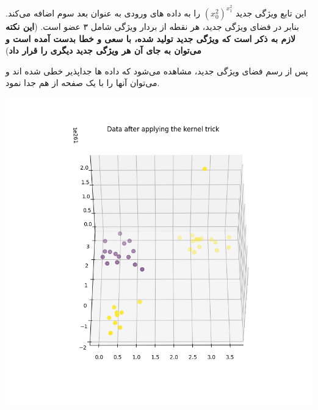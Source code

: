 \begin{enumerate}
\begin{qsolve}
		این تابع ویژگی جدید ${(x_0^2)}^{x_1^2}$ را به داده های ورودی به عنوان بعد سوم اضافه می‌کند. بنابر در فضای ویژگی جدید، هر نقطه از بردار ویژگی شامل ۳ عضو است. (\textbf{این نکته لازم به ذکر است که ویژگی جدید تولید شده، با سعی و خطا بدست آمده است و می‌توان به جای آن هر ویژگی جدید دیگری را قرار داد})
		
		
		پس از رسم فضای ویژگی جدید، مشاهده می‌شود که داده ها جداپذیر خطی شده اند و می‌توان آنها را با یک صفحه از هم جدا نمود.
		
		\begin{center}
			\includegraphics*[width=0.8\linewidth]{pics/img6.png}
			\label{فضای ویژگی های جدید در ۳ بعد}
		\end{center}
	\end{qsolve}
\end{enumerate}



	

		
		
		
		
			
		
		
		
		
		
			
		
		
		
		

		
	
	
	

	
	
	
	

	
	
